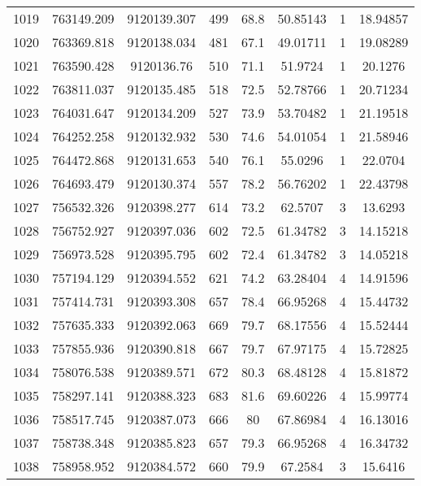 \begin{longtable}{cccccccc}
1019 & 763149.209      & 9120139.307      & 499     & 68.8  & 50.85143 & 1  & 18.94857 \\
1020 & 763369.818      & 9120138.034      & 481     & 67.1  & 49.01711 & 1  & 19.08289 \\
1021 & 763590.428      & 9120136.76       & 510     & 71.1  & 51.9724  & 1  & 20.1276  \\
1022 & 763811.037      & 9120135.485      & 518     & 72.5  & 52.78766 & 1  & 20.71234 \\
1023 & 764031.647      & 9120134.209      & 527     & 73.9  & 53.70482 & 1  & 21.19518 \\
1024 & 764252.258      & 9120132.932      & 530     & 74.6  & 54.01054 & 1  & 21.58946 \\
1025 & 764472.868      & 9120131.653      & 540     & 76.1  & 55.0296  & 1  & 22.0704  \\
1026 & 764693.479      & 9120130.374      & 557     & 78.2  & 56.76202 & 1  & 22.43798 \\
1027 & 756532.326      & 9120398.277      & 614     & 73.2  & 62.5707  & 3  & 13.6293  \\
1028 & 756752.927      & 9120397.036      & 602     & 72.5  & 61.34782 & 3  & 14.15218 \\
1029 & 756973.528      & 9120395.795      & 602     & 72.4  & 61.34782 & 3  & 14.05218 \\
1030 & 757194.129      & 9120394.552      & 621     & 74.2  & 63.28404 & 4  & 14.91596 \\
1031 & 757414.731      & 9120393.308      & 657     & 78.4  & 66.95268 & 4  & 15.44732 \\
1032 & 757635.333      & 9120392.063      & 669     & 79.7  & 68.17556 & 4  & 15.52444 \\
1033 & 757855.936      & 9120390.818      & 667     & 79.7  & 67.97175 & 4  & 15.72825 \\
1034 & 758076.538      & 9120389.571      & 672     & 80.3  & 68.48128 & 4  & 15.81872 \\
1035 & 758297.141      & 9120388.323      & 683     & 81.6  & 69.60226 & 4  & 15.99774 \\
1036 & 758517.745      & 9120387.073      & 666     & 80    & 67.86984 & 4  & 16.13016 \\
1037 & 758738.348      & 9120385.823      & 657     & 79.3  & 66.95268 & 4  & 16.34732 \\
1038 & 758958.952      & 9120384.572      & 660     & 79.9  & 67.2584  & 3  & 15.6416  \\

\end{longtable}
